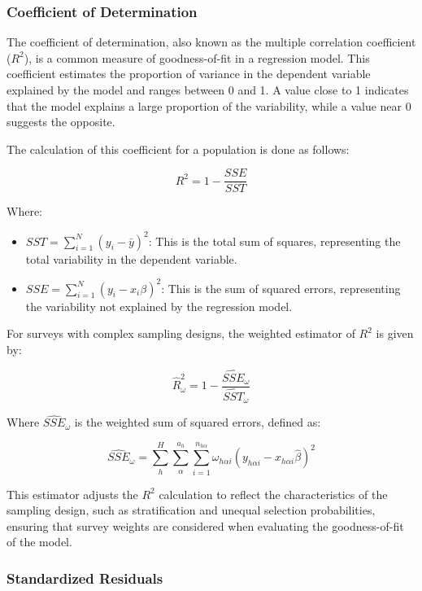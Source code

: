 \documentclass[
  12pt,
]{book}
\providecommand{\tightlist}{%
  \setlength{\itemsep}{0pt}\setlength{\parskip}{0pt}}
\begin{document}
\subsubsection{Coefficient of Determination}\label{coefficient-of-determination}

The coefficient of determination, also known as the multiple correlation coefficient (\(R^{2}\)), is a common measure of goodness-of-fit in a regression model. This coefficient estimates the proportion of variance in the dependent variable explained by the model and ranges between 0 and 1. A value close to 1 indicates that the model explains a large proportion of the variability, while a value near 0 suggests the opposite.

The calculation of this coefficient for a population is done as follows:

\[
R^{2} =  1-\frac{SSE}{SST}
\]

Where:

\begin{itemize}
\tightlist
\item
  \(SST= \sum_{i=1}^N (y_i - \bar{y})^2\): This is the total sum of squares, representing the total variability in the dependent variable.
\item
  \(SSE= \sum_{i=1}^N (y_i - x_i \beta)^2\): This is the sum of squared errors, representing the variability not explained by the regression model.
\end{itemize}

For surveys with complex sampling designs, the weighted estimator of \(R^{2}\) is given by:

\[
\widehat{R}_{\omega}^{2} = 1-\frac{\widehat{SSE}_{\omega}}{\widehat{SST}_{\omega}}
\]

Where \(\widehat{SSE}_{\omega}\) is the weighted sum of squared errors, defined as:

\[
\widehat{SSE}_{\omega}  =  \sum_{h}^{H}\sum_{\alpha}^{a_{h}}\sum_{i=1}^{n_{h\alpha}}\omega_{h\alpha i}\left(y_{h\alpha i}-x_{h\alpha i}\hat{\beta}\right)^{2}
\]

This estimator adjusts the \(R^{2}\) calculation to reflect the characteristics of the sampling design, such as stratification and unequal selection probabilities, ensuring that survey weights are considered when evaluating the goodness-of-fit of the model.

\subsubsection{Standardized Residuals}\label{standardized-residuals}
\end{document}
